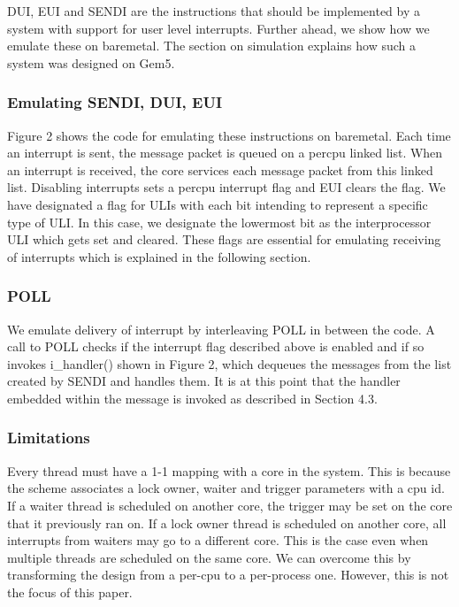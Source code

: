 DUI, EUI and SENDI are the instructions that should be implemented by a system
with support for user level interrupts. Further ahead, we show how we emulate
these on baremetal. The section on simulation explains how such a system was
designed on Gem5.

\subsubsection{Emulating SENDI, DUI, EUI}

Figure 2 shows the code for emulating these instructions on baremetal. Each time
an interrupt is sent, the message packet is queued on a percpu linked list. When
an interrupt is received, the core services each message packet from this linked
list. Disabling interrupts sets a percpu interrupt flag and EUI clears the flag.
We have designated a flag for ULIs with each bit intending to represent a
specific type of ULI.  In this case, we designate the lowermost bit as the
interprocessor ULI which gets set and cleared. These flags are essential for
emulating receiving of interrupts which is explained in the following section.

\subsubsection{POLL}

We emulate delivery of interrupt by interleaving POLL in between the code. A
call to POLL checks if the interrupt flag described above is enabled and if so
invokes i\_handler() shown in Figure 2, which dequeues the messages from the list
created by SENDI and handles them.  It is at this point that the handler
embedded within the message is invoked as described in Section 4.3.

\subsubsection{Limitations}

Every thread must have a 1-1 mapping with a core in the system. This is because
the scheme associates a lock owner, waiter and trigger parameters with a cpu id.
If a waiter thread is scheduled on another core, the trigger may be set on the
core that it previously ran on. If a lock owner thread is scheduled on another
core, all interrupts from waiters may go to a different core. This is the case
even when multiple threads are scheduled on the same core. We can overcome this
by transforming the design from a per-cpu to a per-process one. However, this is
not the focus of this paper.

